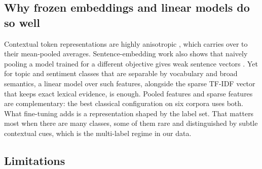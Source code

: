\documentclass{ijis}
\begin{document}
\subsection{Why frozen embeddings and linear models do so well}

Contextual token representations are highly anisotropic \cite{ethayarajh2019contextual}, which carries over to their mean-pooled averages. Sentence-embedding work also shows that naively pooling a model trained for a different objective gives weak sentence vectors \cite{reimers2019sentence}. Yet for topic and sentiment classes that are separable by vocabulary and broad semantics, a linear model over such features, alongside the sparse TF-IDF vector that keeps exact lexical evidence, is enough. Pooled features and sparse features are complementary: the best classical configuration on six corpora uses both. What fine-tuning adds is a representation shaped by the label set. That matters most when there are many classes, some of them rare and distinguished by subtle contextual cues, which is the multi-label regime in our data.

\subsection{Limitations}
\end{document}
